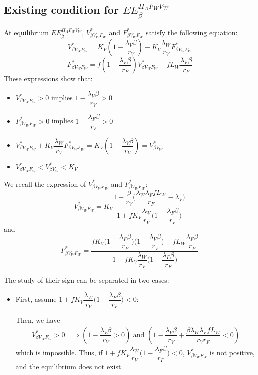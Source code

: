 \documentclass{article}
\newcommand{\lfw}{\lambda_{F}}
\newcommand{\lvw}{\lambda_{V}}
\newcommand{\lfv}{\lambda_{W}}
\begin{document}
\begin{appendices}
\section{Existing condition for $EE^{H_AF_WV_W}_\beta$ \label{appendix:Existing condition:EEHAFWVW}}

At equilibrium $EE^{H_AF_WV_W}_\beta$, $V^*_{\beta V_WF_W}$ and $F^*_{\beta V_WF_W}$ satisfy the following equation:
$$
V^*_{\beta V_WF_W} = K_V\left(1 - \dfrac{\lvw \beta}{r_V}\right) - K_V \dfrac{\lfv}{r_V} F^*_{\beta V_WF_W}
$$
$$
F^*_{\beta V_WF_W} = f \left(1 - \dfrac{\lfw \beta}{r_F} \right) V^*_{\beta V_WF_W} - fL_W \dfrac{\lfw \beta}{r_F}
$$
These expressions show that:
\begin{itemize}
 \item $V^*_{\beta V_WF_W} > 0$ implies $1 - \dfrac{\lvw \beta}{r_V} > 0$
 \item $F^*_{\beta V_WF_W} > 0$ implies $1 - \dfrac{\lfw \beta}{r_F} > 0$
 \item $V^*_{\beta V_WF_W} + K_V \dfrac{\lfv}{r_V} F^*_{\beta V_WF_W} = K_V\left(1 - \dfrac{\lvw \beta}{r_V}\right) = V^*_{\beta V_W}$
 \item $V^*_{\beta V_WF_W} < V^*_{\beta V_W} < K_V$
\end{itemize}

We recall the expression of $V^*_{\beta V_WF_W}$ and $F^*_{\beta V_WF_W}$:
$$V_{\beta V_WF_W}^* = K_V \dfrac{1 + \dfrac{\beta}{r_V}\Big(\dfrac{\lfv \lfw f L_W}{r_F} - \lvw \Big)}{1 + fK_V\dfrac{\lfv}{r_V}\Big(1 - \dfrac{\lfw \beta}{r_F}\Big)}
$$
and
$$F_{\beta V_WF_W}^* = \dfrac{fK_V\Big(1 - \dfrac{\lfw \beta}{r_F}\Big)\Big(1 - \dfrac{\lvw \beta}{r_V}\Big) - fL_W \dfrac{\lfw \beta}{r_F}}{1 + f K_V \dfrac{\lfv}{r_V} \Big(1 - \dfrac{\lfw \beta}{r_F}\Big)} $$

The study of their sign can be separated in two cases:
\begin{itemize}
\item First, assume $1 + f K_V \dfrac{\lfv}{r_V} \Big(1 - \dfrac{\lfw \beta}{r_F}\Big) < 0$:

Then, we have
\begin{align*}
 V^*_{\beta V_WF_W} > 0 & \Rightarrow \left(1 - \dfrac{\lvw \beta}{r_V} > 0 \right) \text{ and } \left(1 - \dfrac{\lvw \beta}{r_V} + \dfrac{\beta \lfv \lfw f L_W}{r_V r_F} < 0 \right)
\end{align*}
which is impossible. Thus, if $1 + f K_V \dfrac{\lfv}{r_V} \Big(1 - \dfrac{\lfw \beta}{r_F}\Big) < 0$, $V^*_{\beta V_WF_W}$ is not positive, and the equilibrium does not exist.


\end{itemize}
\end{appendices}
\end{document}
